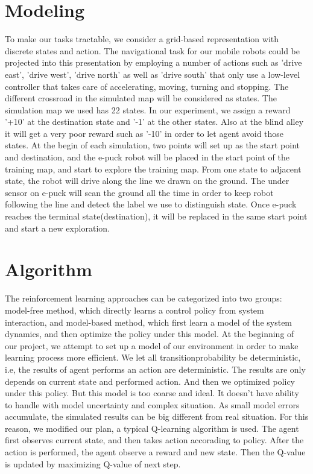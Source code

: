 \documentclass[a4paper, 11pt]{article} %
\begin{document}
\section{Modeling}
To make our tasks tractable, we consider a grid-based representation with discrete
states and action. The navigational task for our mobile robots could be projected
into this presentation by employing a number of actions such as 'drive east',
'drive west', 'drive north' as well as 'drive south' that only use a low-level
controller that takes care of accelerating, moving, turning and stopping. The
different crossroad in the simulated map will be considered as states. The simulation
map we used has 22 states. In our experiment, we assign a reward '+10' at the destination
state and '-1' at the other states. Also at the blind alley it will get a very poor
reward such as '-10' in order to let agent avoid those states. At the begin of
each simulation, two points will set up as the start point and destination,
and the e-puck robot will be placed in the start point of the training map, and
start to explore the training map. From one state to adjacent state, the robot will
drive along the line we drawn on the ground. The under sensor on e-puck
will scan the ground all the time in order to keep robot following the line
and detect the label we use to distinguish state. Once e-puck reaches the terminal
state(destination), it will be replaced in the same start point and start a new
exploration.

\section{Algorithm}
The reinforcement learning approaches can be categorized into two groups: model-free
method, which directly learns a control policy from system interaction, and
model-based method, which first learn a model of the system dynamics, and then
optimize the policy under this model. At the beginning of our project, we attempt to
set up a model of our environment in order to make learning process more efficient.
We let all transitionprobability be deterministic, i.e, the results of agent performs
an action are deterministic. The results are only depends on current state and performed
action. And then we optimized policy under this policy. But this model is too coarse
and ideal. It doesn't have ability to handle with model uncertainty and complex situation.
As small model errors accumulate, the simulated results can be big different from
real situation. For this reason, we modified our plan, a typical Q-learning algorithm
is used. The agent first observes current state, and then takes action accorading to
policy. After the action is performed, the agent observe a reward and new state.
Then the Q-value is updated by maximizing Q-value of next step.
\end{document}
